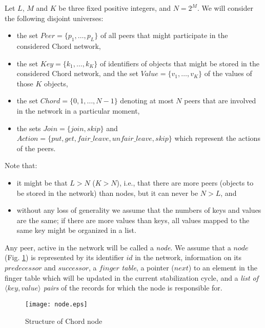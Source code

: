\documentclass{amsart}
\theoremstyle{definition}
\begin{document}
Let $L$, $M$ and $K$ be three fixed positive integers, and $N = 2^M$. We will consider the following disjoint universes:
\begin{itemize}
    \item the set $Peer = \{p_1, \ldots, p_L \}$ of all peers that might participate in the considered Chord network,



    \item the set $Key = \{ k_1, \ldots, k_K\}$ of identifiers of objects that might be stored in the considered Chord network, and
    the set $Value = \{ v_1, \ldots, v_K\}$ of the values of those $K$ objects,

    \item the set $Chord = \{0, 1, \ldots , N-1\}$ denoting at most $N$ peers that are involved in the network in a particular
    moment,

    \item the sets $Join = \{join, skip\}$ and $Action=\{put, get, fair\_leave, unfair\_leave, skip\}$  which represent the actions of the
    peers.
\end{itemize}
Note that:
\begin{itemize}
    \item it might be that $L > N$ ($K > N$), i.e., that there are more peers (objects to be stored in the network) than nodes,
    but it can never be $N > L$, and

    \item without any loss of generality we assume that the numbers of keys and values are the same; if there are more values than
    keys, all values mapped to the same key might be organized in a list.
\end{itemize}



Any peer, active in the network
will be called a {\em node}.
We assume that a $node$ (Fig. \ref{node}) is represented by its identifier $id$ in the network, information on its $predecessor$
 and $successor$, a $finger$  {\em table}, a pointer ($next$) to an element in the finger table which will be updated
in the current stabilization cycle, and a {\em list of $\langle key, value \rangle$ pairs} of the records for which the node is responsible for.


\begin{figure}
\centering
\texttt{[image: node.eps]}

\caption{Structure of Chord node} \label{node}
\end{figure}
\end{document}
